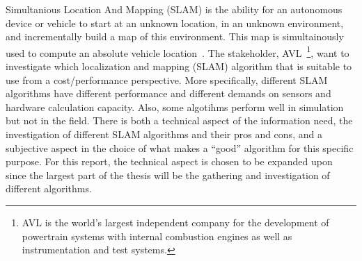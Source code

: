Simultanious Location And Mapping (SLAM) is the ability for an autonomous
device or vehicle to start at an unknown location, in an unknown environment, and
incrementally build a map of this environment. This map is simultainously used to compute
an absolute vehicle location~\cite{938381}. The stakeholder, AVL~\footnote{AVL is the world's largest independent company for the development of powertrain systems with internal combustion engines as well as instrumentation and test systems.}, want to investigate which localization and mapping (SLAM) algorithm
that is suitable to use from a cost/performance perspective. More specifically,
different SLAM algorithms have different performance and different demands on
sensors and hardware calculation capacity. Also, some algotihms perform well in
simulation but not in the field.  There is both a technical aspect of the
information need, the investigation of different SLAM algorithms and their pros
and cons, and a subjective aspect in the choice of what makes a “good”
algorithm for this specific purpose. For this report, the technical aspect is
chosen to be expanded upon since the largest part of the thesis will be the
gathering and investigation of different algorithms.
